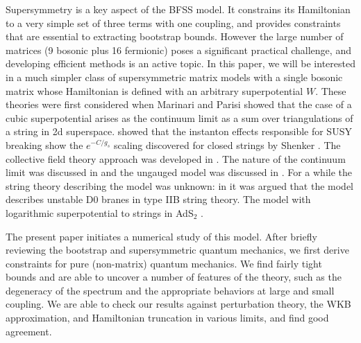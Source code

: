 \documentclass[a4paper,11pt]{article}
\numberwithin{equation}{section}
\begin{document}
Supersymmetry is a key aspect of the BFSS model. It constrains its Hamiltonian to a very simple set of three terms with one coupling, and provides constraints that are essential to extracting bootstrap bounds. However the large number of matrices (9 bosonic plus 16 fermionic) poses a significant practical challenge, and developing efficient methods is an active topic. In this paper, we will be interested in a much simpler class of supersymmetric matrix models with a single bosonic matrix whose Hamiltonian is defined with an arbitrary superpotential $W$. These theories were first considered when Marinari and Parisi \cite{Marinari:1990jc} showed that the case of a cubic superpotential arises as the continuum limit as a sum over triangulations of a string in 2d superspace.  %
\cite{Dabholkar:1991te} showed that the instanton effects responsible for SUSY breaking show the $e^{-C/g_s}$ scaling discovered for closed strings by Shenker \cite{Shenker:1990uf,Ferretti:1993fu}. The collective field theory approach was developed in \cite{Cohn:1992zj, Rodrigues:1992by, Brustein:1993nc}. %
The nature of the continuum limit was discussed in \cite{Chaudhuri:1994yk} and the ungauged model was discussed in \cite{Kim:2005rp}. For a while the string theory describing the model was unknown: in \cite{McGreevy:2003dn} it was argued that the model describes unstable D0 branes in type IIB string theory. The model with logarithmic superpotential to strings in AdS${}_2$ \cite{Verlinde:2004gt}.

The present paper initiates a numerical study of this model. After briefly reviewing the bootstrap and supersymmetric quantum mechanics, we first derive constraints for pure (non-matrix) quantum mechanics. We find fairly tight bounds and are able to uncover a number of features of the theory, such as the degeneracy of the spectrum and the appropriate behaviors at large and small coupling. We are able to check our results against perturbation theory, the WKB approximation, and Hamiltonian truncation in various limits, and find good agreement. 
\end{document}
